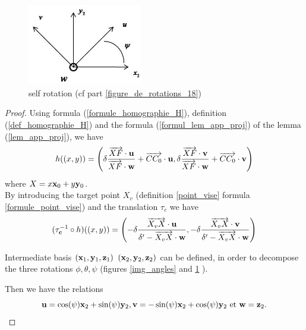 \begin{figure}[h!]
\centering
\includegraphics[width=5cm]{graphe3.jpg}
\caption{self rotation (cf part \ref{figure_de_rotations_18})}
\label{decompgeo_rotationPropre}
\end{figure}





\begin{proof}
Using formula (\ref{formule_homographie_H}), definition (\ref{def_homographie_H}) and the formula (\ref{formul_lem_app_proj}) of the lemma (\ref{lem_app_proj}), we have
\begin{equation*}
h((x,y))=\left( \delta \frac{\overrightarrow{XF}\cdot \mathbf{u}}{\overrightarrow{XF} \cdot \mathbf{w}} +\overrightarrow{CC_0 } \cdot \mathbf{u}, \delta \frac{\overrightarrow{XF}\cdot \mathbf{v}}{\overrightarrow{XF} \cdot  \mathbf{w}}+\overrightarrow{CC_0 }\cdot \mathbf{v} \right)
\end{equation*}
where $X=x \mathbf{x}_0 + y \mathbf{y}_0 $.\\

By introducing the target point $X_v$ (definition \ref{point_vise} formula \ref{formule_point_vise}) and the translation $\tau_c$ we have
\begin{equation}
(\tau_{\mathbf{c}}^{-1} \circ h)((x,y)) = \left ( -\delta \frac{\overrightarrow{X_vX}\cdot \mathbf{u}}{\delta' -\overrightarrow{X_vX} \cdot \mathbf{w}},-\delta \frac{\overrightarrow{X_vX}\cdot \mathbf{v}}{\delta' -\overrightarrow{X_vX} \cdot \mathbf{w}} \right)
\label{decomp_formul_intermediaire_1}
\end{equation}


Intermediate basis $(\mathbf{x}_1 ,\mathbf{y}_1 ,\mathbf{z}_1)$  $(\mathbf{x}_2 ,\mathbf{y}_2 ,\mathbf{z}_2)$ can be defined, in order to decompose the three rotations $\phi,\theta,\psi$ (figures \ref{img_angles} and \ref{decompgeo_rotationPropre} ).

Then we have the relations
\begin{equation*}
\mathbf{u}=\cos(\psi)\mathbf{x}_{2}+\sin(\psi)\mathbf{y}_{2} , \mathbf{v}=-\sin(\psi)\mathbf{x}_{2}+\cos(\psi)\mathbf{y}_{2} \text{ et } \mathbf{w}=\mathbf{z}_2.
\end{equation*}


\end{proof}
